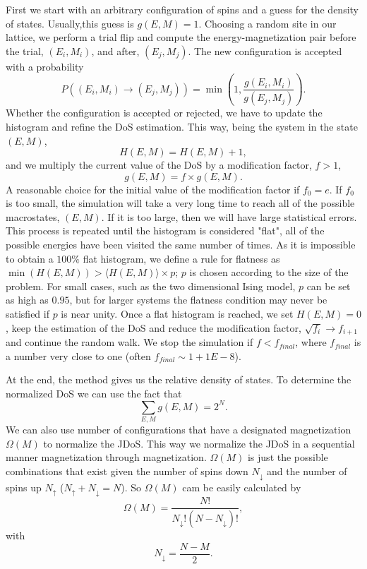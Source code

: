 First we start with an arbitrary configuration of spins and a guess for the density of states. Usually,this  guess is $g(E, M)=1$. Choosing a random site in our lattice, we perform a trial flip and compute the energy-magnetization pair before the trial, $(E_i, M_i)$, and after, $(E_j,M_j)$. The new configuration is accepted with a probability
\begin{equation}
	P((E_i, M_i) \rightarrow (E_j, M_j)) = \min\left(1, \frac{g(E_i, M_i)}{g(E_j, M_j)}\right).
\end{equation}
Whether the configuration is accepted or rejected, we have to update the histogram and refine the DoS estimation. This way, being the system in the state $(E, M)$,
\begin{equation*}
	H(E, M) = H(E,M)+1,
\end{equation*}
and we multiply the current value of the DoS by a modification factor, $f > 1$,
\begin{equation*}
	g(E,M)=f \times g(E,M).
\end{equation*}
A reasonable choice for the initial value of the modification factor if $f_0 = e$. If $f_0$ is too small, the simulation will take a very long time to reach all of the possible macrostates, $(E,M)$. If it is too large, then we will have large statistical errors.  
This process is repeated until the histogram is considered "flat", all of the possible energies have been visited the same number of times. As it is impossible to obtain a $100\%$ flat histogram, we define a rule for flatness as $\min(H(E, M)) > \langle H(E, M) \rangle \times p$; $p$ is chosen according to the size of the problem. For small cases, such as the two dimensional Ising model, $p$ can be set as high as $0.95$, but for larger systems the flatness condition may never be satisfied if $p$ is near unity.  
Once a flat histogram is reached, we set $H(E, M)=0$, keep the estimation of the DoS and reduce the modification factor, $\sqrt{f_{i}} \rightarrow f_{i+1}$ and continue the random walk. We stop the simulation if $f<f_{final}$, where $f_{final}$ is a number very close to one (often $f_{final} \sim 1+1E-8$). 

At the end, the method gives us the relative density of states. To determine the normalized DoS we can use the fact that 
\begin{equation}
	\sum_{E,M} g(E,M) = 2^N.
\end{equation}
We can also use number of configurations that have a designated magnetization $\Omega(M)$ to normalize the JDoS. This way we normalize the JDoS in a sequential manner magnetization through magnetization.
$\Omega(M)$ is just the possible combinations that exist given the number of spins down $N_{\downarrow}$ and the number of spins up $N_{\uparrow}$ ($N_{\uparrow} + N_{\downarrow} = N$). So $\Omega(M)$ cam be easily calculated by 
\begin{equation}\label{norm_fact}
	\Omega(M) = \frac{N!}{N_{\downarrow}! (N - N_{\downarrow})!},
\end{equation}
with
\begin{equation}
	N_{\downarrow} = \frac{N-M}{2}.
\end{equation}

